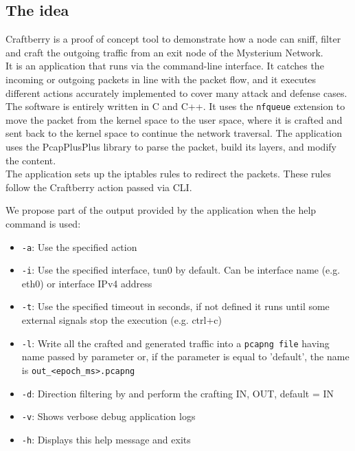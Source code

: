 \documentclass[12pt]{article}
\begin{document}
	\subsection{The idea}
	Craftberry is a proof of concept tool to demonstrate how a node can sniff, filter and craft the outgoing traffic from an exit node of the Mysterium Network.\\
	It is an application that runs via the command-line interface. It catches the incoming or outgoing packets in line with the packet flow, and it executes different actions accurately implemented to cover many attack and defense cases.\\
	The software is entirely written in C and C++. It uses the \lstinline{nfqueue} extension to move the packet from the kernel space to the user space, where it is crafted and sent back to the kernel space to continue the network traversal. The application uses the PcapPlusPlus library to parse the packet, build its layers, and modify the content.\\
	The application sets up the iptables rules to redirect the packets. These rules follow the Craftberry action passed via CLI.\\
	\bigbreak

	We propose part of the output provided by the application when the help command is used:
	\begin{itemize}
		\item \lstinline{-a}: Use the specified action
		\item  \lstinline{-i}: Use the specified interface, tun0 by default. Can be interface name (e.g. eth0) or interface IPv4 address
		\item  \lstinline{-t}: Use the specified timeout in seconds, if not defined it runs until some external signals stop the execution (e.g. ctrl+c)
		\item  \lstinline{-l}: Write all the crafted and generated traffic into a \lstinline{pcapng file} having name passed by parameter or, if the parameter is equal to 'default', the name is \lstinline{out_<epoch_ms>.pcapng}
		\item  \lstinline{-d}: Direction filtering by and perform the crafting {IN, OUT}, default = IN
		\item  \lstinline{-v}: Shows verbose debug application logs
		\item  \lstinline{-h}: Displays this help message and exits
	\end{itemize}
	
	\bigbreak
		
\end{document}
